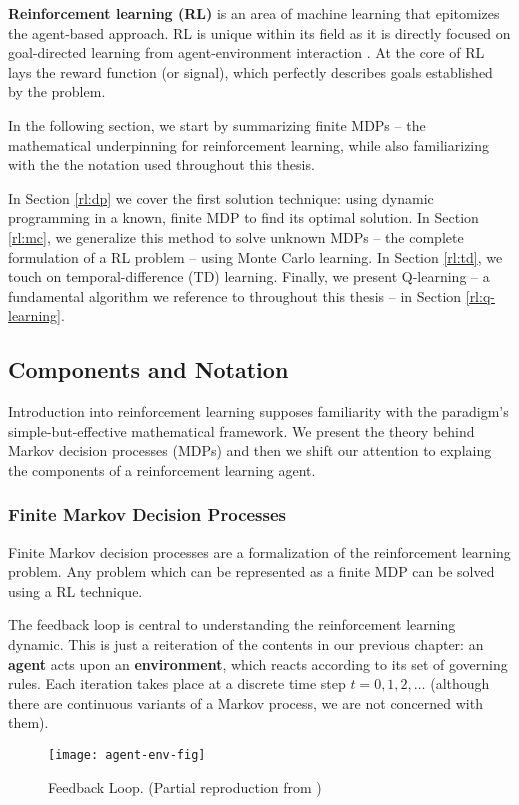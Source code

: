 \textbf{Reinforcement learning (RL)} is an area of machine learning that epitomizes the agent-based approach.
RL is unique within its field as it is directly focused on goal-directed learning from agent-environment interaction \cite{rlai}.
At the core of RL lays the reward function (or signal), which perfectly describes goals established by the problem.

In the following section, we start by summarizing finite MDPs -- the mathematical underpinning for reinforcement learning, while also familiarizing with the the notation used throughout this thesis.

In Section \ref{rl:dp} we cover the first solution technique: using dynamic programming in a known, finite MDP to find its optimal solution.
In Section \ref{rl:mc}, we generalize this method to solve unknown MDPs -- the complete formulation of a RL problem -- using Monte Carlo learning.
In Section \ref{rl:td}, we touch on temporal-difference (TD) learning. Finally, we present Q-learning -- a fundamental algorithm we reference to throughout this thesis -- in Section \ref{rl:q-learning}.

\subsection{Components and Notation}
Introduction into reinforcement learning supposes familiarity with the paradigm's simple-but-effective mathematical framework.
We present the theory behind Markov decision processes (MDPs) and then we shift our attention to explaing the components of a reinforcement learning agent.

\subsubsection{Finite Markov Decision Processes}
Finite Markov decision processes are a formalization of the reinforcement learning problem.
Any problem which can be represented as a finite MDP can be solved using a RL technique.

The feedback loop is central to understanding the reinforcement learning dynamic.
This is just a reiteration of the contents in our previous chapter:
an \textbf{agent} acts upon an \textbf{environment}, which reacts according to its set of governing rules.
Each iteration takes place at a discrete time step \(t = 0,1,2,\dots \) (although there are continuous variants of a Markov process, we are not concerned with them).

\begin{figure}[ht]
    \centering
    \caption{Feedback Loop. (Partial reproduction from \cite{rlai})}
    \vspace*{0.2cm}
    \texttt{[image: agent-env-fig]}
\end{figure}


